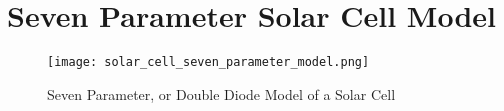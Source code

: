 \section{Seven Parameter Solar Cell Model}\label{sec:seven_parameter_solar_cell_model}


\begin{figure}[h]
    \texttt{[image: solar\_cell\_seven\_parameter\_model.png]}
    \caption{Seven Parameter, or Double Diode Model of a Solar Cell}
    \label{fig:double_diode_model}
\end{figure}
